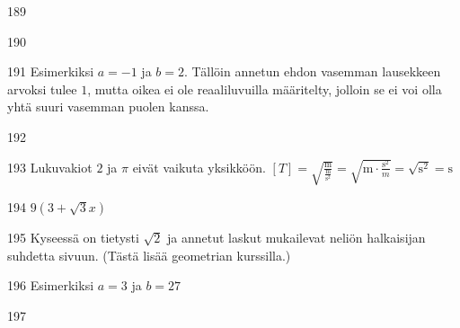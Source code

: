 \begin{Vastaus}{189}
	
\end{Vastaus}
\begin{Vastaus}{190}
	
\end{Vastaus}
\begin{Vastaus}{191}
Esimerkiksi $a=-1$ ja $b=2$. Tällöin annetun ehdon vasemman lausekkeen arvoksi tulee $1$, mutta oikea ei ole reaaliluvuilla määritelty, jolloin se ei voi olla yhtä suuri vasemman puolen kanssa.
	
\end{Vastaus}
\begin{Vastaus}{192}
	
\end{Vastaus}
\begin{Vastaus}{193}
	Lukuvakiot $2$ ja $\pi$ eivät vaikuta yksikköön. $[T]=\sqrt{\frac{\text{m}}{\frac{\text{m}}{\text{s}^2}}}=\sqrt{\text{m}\cdot \frac{\text{s}^2}{m}}=\sqrt{\text{s}^2}=\text{s}$
	
\end{Vastaus}
\begin{Vastaus}{194}
$9(3 + \sqrt{3}x)$
	
\end{Vastaus}
\begin{Vastaus}{195}
Kyseessä on tietysti $\sqrt{2}$ ja annetut laskut mukailevat neliön halkaisijan suhdetta sivuun. (Tästä lisää geometrian kurssilla.)
	
\end{Vastaus}
\begin{Vastaus}{196}
Esimerkiksi $a=3$ ja $b=27$
	
\end{Vastaus}
\begin{Vastaus}{197}
	
\end{Vastaus}
